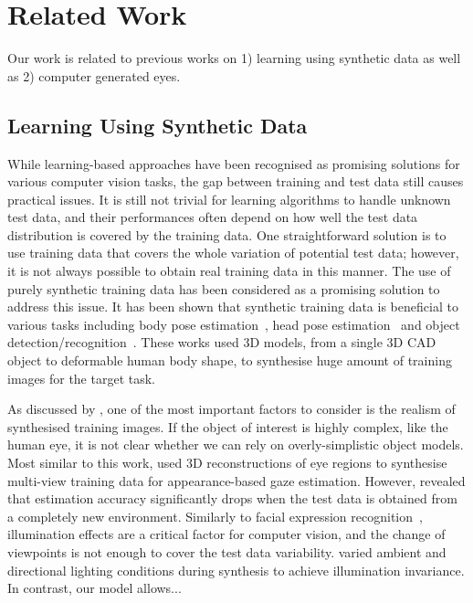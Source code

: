 
\section{Related Work}

Our work is related to previous works on 1) learning using synthetic data as well as 2) computer generated eyes.

\subsection{Learning Using Synthetic Data}

While learning-based approaches have been recognised as promising solutions for various computer vision tasks, the gap between training and test data still causes practical issues.
It is still not trivial for learning algorithms to handle unknown test data, and their performances often depend on how well the test data distribution is covered by the training data.
One straightforward solution is to use training data that covers the whole variation of potential test data; however, it is not always possible to obtain real training data in this manner.
The use of purely synthetic training data has been considered as a promising solution to address this issue.
It has been shown that synthetic training data is beneficial to various tasks including body pose estimation~\cite{shakhnarovich2003fast,okada2008relevant,shotton2013real}, head pose estimation~\cite{fanelli2011real} and object detection/recognition~\cite{yu2010improving,liebelt2010multiview,jaderberg2014synthetic}.
These works used 3D models, from a single 3D CAD object to deformable human body shape, to synthesise huge amount of training images for the target task.

As discussed by \citet{kaneva2011evaluation} , one of the most important factors to consider is the realism of synthesised training images.
If the object of interest is highly complex, like the human eye, it is not clear whether we can rely on overly-simplistic object models.
Most similar to this work, \citet{sugano2014learning} used 3D reconstructions of eye regions to synthesise multi-view training data for appearance-based gaze estimation.
However, \citet{zhang15_cvpr} revealed that estimation accuracy significantly drops when the test data is obtained from a completely new environment.
Similarly to facial expression recognition~\cite{stratou2011effect}, illumination effects are a critical factor for computer vision, and the change of viewpoints is not enough to cover the test data variability.
\citet{zface} varied ambient and directional lighting conditions during synthesis to achieve illumination invariance.
In contrast, our model allows...

